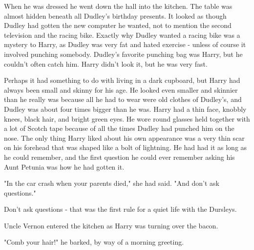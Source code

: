When he was dressed he went down the hall into the kitchen. The table was almost hidden beneath all Dudley's birthday presents. It looked as though Dudley had gotten the new computer he wanted, not to mention the second television and the racing bike. Exactly why Dudley wanted a racing bike was a mystery to Harry, as Dudley was very fat and hated exercise - unless of course it involved punching somebody. Dudley's favorite punching bag was Harry, but he couldn't often catch him. Harry didn't look it, but he was very fast. 

Perhaps it had something to do with living in a dark cupboard, but Harry had always been small and skinny for his age. He looked even smaller and skinnier than he really was because all he had to wear were old clothes of Dudley's, and Dudley was about four times bigger than he was. Harry had a thin face, knobbly knees, black hair, and bright green eyes. He wore round glasses held together with a lot of Scotch tape because of all the times Dudley had punched him on the nose. The only thing Harry liked about his own appearance was a very thin scar on his forehead that was shaped like a bolt of lightning. He had had it as long as he could remember, and the first question he could ever remember asking his Aunt Petunia was how he had gotten it. 

"In the car crash when your parents died," she had said. "And don't ask questions." 

Don't ask questions - that was the first rule for a quiet life with the Dursleys. 

Uncle Vernon entered the kitchen as Harry was turning over the bacon. 

"Comb your hair!" he barked, by way of a morning greeting.
